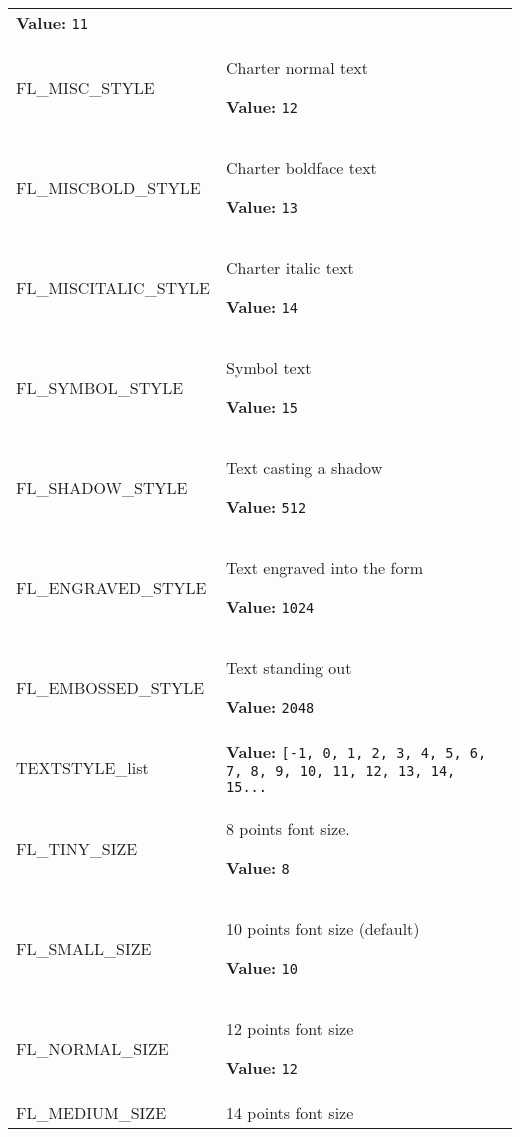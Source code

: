 \begin{longtable}{|p{\varnamewidth}|p{\vardescrwidth}|l}
\textbf{Value:} 
{\tt 11}&\\
\cline{1-2}
\raggedright F\-L\-\_\-M\-I\-S\-C\-\_\-S\-T\-Y\-L\-E\- & \raggedright Charter normal text

\textbf{Value:} 
{\tt 12}&\\
\cline{1-2}
\raggedright F\-L\-\_\-M\-I\-S\-C\-B\-O\-L\-D\-\_\-S\-T\-Y\-L\-E\- & \raggedright Charter boldface text

\textbf{Value:} 
{\tt 13}&\\
\cline{1-2}
\raggedright F\-L\-\_\-M\-I\-S\-C\-I\-T\-A\-L\-I\-C\-\_\-S\-T\-Y\-L\-E\- & \raggedright Charter italic text

\textbf{Value:} 
{\tt 14}&\\
\cline{1-2}
\raggedright F\-L\-\_\-S\-Y\-M\-B\-O\-L\-\_\-S\-T\-Y\-L\-E\- & \raggedright Symbol text

\textbf{Value:} 
{\tt 15}&\\
\cline{1-2}
\raggedright F\-L\-\_\-S\-H\-A\-D\-O\-W\-\_\-S\-T\-Y\-L\-E\- & \raggedright Text casting a shadow

\textbf{Value:} 
{\tt 512}&\\
\cline{1-2}
\raggedright F\-L\-\_\-E\-N\-G\-R\-A\-V\-E\-D\-\_\-S\-T\-Y\-L\-E\- & \raggedright Text engraved into the form

\textbf{Value:} 
{\tt 1024}&\\
\cline{1-2}
\raggedright F\-L\-\_\-E\-M\-B\-O\-S\-S\-E\-D\-\_\-S\-T\-Y\-L\-E\- & \raggedright Text standing out

\textbf{Value:} 
{\tt 2048}&\\
\cline{1-2}
\raggedright T\-E\-X\-T\-S\-T\-Y\-L\-E\-\_\-l\-i\-s\-t\- & \raggedright \textbf{Value:} 
{\tt \texttt{[}-1\texttt{, }0\texttt{, }1\texttt{, }2\texttt{, }3\texttt{, }4\texttt{, }5\texttt{, }6\texttt{, }7\texttt{, }8\texttt{, }9\texttt{, }10\texttt{, }11\texttt{, }12\texttt{, }13\texttt{, }14\texttt{, }15\texttt{...}}&\\
\cline{1-2}
\raggedright F\-L\-\_\-T\-I\-N\-Y\-\_\-S\-I\-Z\-E\- & \raggedright 8 points font size.

\textbf{Value:} 
{\tt 8}&\\
\cline{1-2}
\raggedright F\-L\-\_\-S\-M\-A\-L\-L\-\_\-S\-I\-Z\-E\- & \raggedright 10 points font size (default)

\textbf{Value:} 
{\tt 10}&\\
\cline{1-2}
\raggedright F\-L\-\_\-N\-O\-R\-M\-A\-L\-\_\-S\-I\-Z\-E\- & \raggedright 12 points font size

\textbf{Value:} 
{\tt 12}&\\
\cline{1-2}
\raggedright F\-L\-\_\-M\-E\-D\-I\-U\-M\-\_\-S\-I\-Z\-E\- & \raggedright 14 points font size


\end{longtable}
